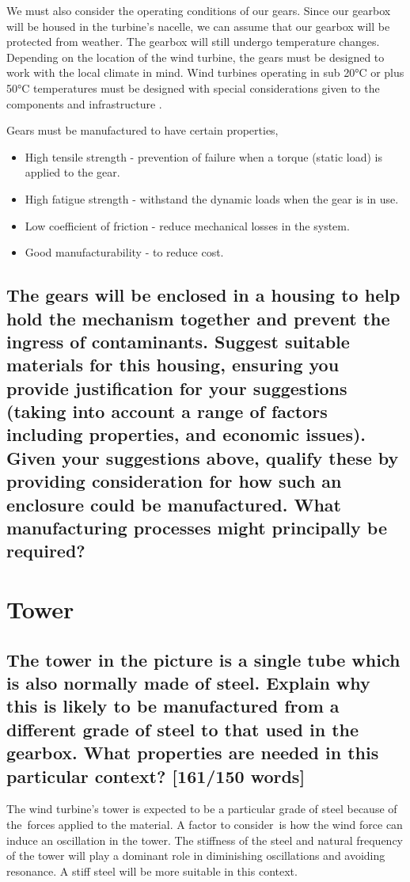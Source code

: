 \documentclass[12pt]{article}
\numberwithin{equation}{section}
\begin{document}
\begin{flushleft}
We must also consider the operating conditions of our gears. Since our gearbox will be housed in the turbine's nacelle, we can assume that our gearbox will be protected from weather. The gearbox will still undergo temperature changes. Depending on the location of the wind turbine, the gears must be designed to work with the local climate in mind. Wind turbines operating in sub 20\si{\celsius} or plus 50\si{\celsius} temperatures must be designed with special considerations given to the components and infrastructure \citep{windTurbineOperatingConditions}. 

Gears must be manufactured to have certain properties,
\begin{itemize}
  \item High tensile strength - prevention of failure when a torque (static load) is applied to the gear.
  \item High fatigue strength - withstand the dynamic loads when the gear is in use.
  \item Low coefficient of friction - reduce mechanical losses in the system.
  \item Good manufacturability - to reduce cost.
\end{itemize}
\subsection{The gears will be enclosed in a housing to help hold the mechanism together and prevent the ingress of contaminants. Suggest suitable materials for this housing, ensuring you provide justification for your suggestions (taking into account a range of factors including properties, and economic issues). Given your suggestions above, qualify these by providing consideration for how such an enclosure could be manufactured. What manufacturing processes might principally be required?}

\section{Tower}
\subsection{The tower in the picture is a single tube which is also normally made of steel. Explain why this is likely to be manufactured from a different grade of steel to that used in the gearbox. What properties are needed in this particular context? [161/150 words]}
The wind turbine’s tower is expected to be a particular grade of steel because of the forces applied to the material. A factor to consider is how the wind force can induce an oscillation in the tower. The stiffness of the steel and natural frequency of the tower will play a dominant role in diminishing oscillations and avoiding resonance. A stiff steel will be more suitable in this context. 


\end{flushleft}
\end{document}
